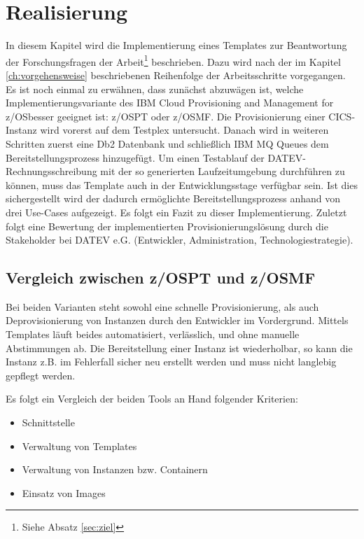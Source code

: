 \chapter{Realisierung}\label{ch:realisierung}
In diesem Kapitel wird die Implementierung eines Templates zur Beantwortung der Forschungsfragen der Arbeit\footnote{Siehe Absatz \ref{sec:ziel}} beschrieben.
Dazu wird nach der im Kapitel \ref{ch:vorgehensweise} beschriebenen Reihenfolge der Arbeitsschritte vorgegangen.
Es ist noch einmal zu erwähnen, dass zunächst abzuwägen ist, welche Implementierungsvariante des \glqq IBM Cloud Provisioning and Management for z/OS\grqq besser geeignet ist: z/OSPT oder z/OSMF.
Die Provisionierung einer CICS-Instanz wird vorerst auf dem Testplex untersucht.
Danach wird in weiteren Schritten zuerst eine Db2 Datenbank und schließlich IBM MQ Queues dem Bereitstellungsprozess hinzugefügt.
Um einen Testablauf der DATEV-Rechnungsschreibung mit der so generierten Laufzeitumgebung durchführen zu können, muss das Template auch in der Entwicklungsstage verfügbar sein.
Ist dies sichergestellt wird der dadurch ermöglichte Bereitstellungsprozess anhand von drei Use-Cases aufgezeigt.
Es folgt ein Fazit zu dieser Implementierung.
Zuletzt folgt eine Bewertung der implementierten Provisionierungslösung durch die Stakeholder bei DATEV e.G. (Entwickler, Administration, Technologiestrategie).

\section{Vergleich zwischen z/OSPT und z/OSMF}
Bei beiden Varianten steht sowohl eine schnelle Provisionierung, als auch Deprovisionierung von Instanzen durch den Entwickler im Vordergrund.
Mittels Templates läuft beides automatisiert, verlässlich, und ohne manuelle Abstimmungen ab.
Die Bereitstellung einer Instanz ist wiederholbar, so kann die Instanz z.B. im Fehlerfall sicher neu erstellt werden und muss nicht langlebig gepflegt werden. 

Es folgt ein Vergleich der beiden Tools an Hand folgender Kriterien:
\begin{samepage}
\begin{itemize}
\item Schnittstelle
\item Verwaltung von Templates
\item Verwaltung von Instanzen bzw. Containern
\item Einsatz von Images
\end{itemize}
\end{samepage}

